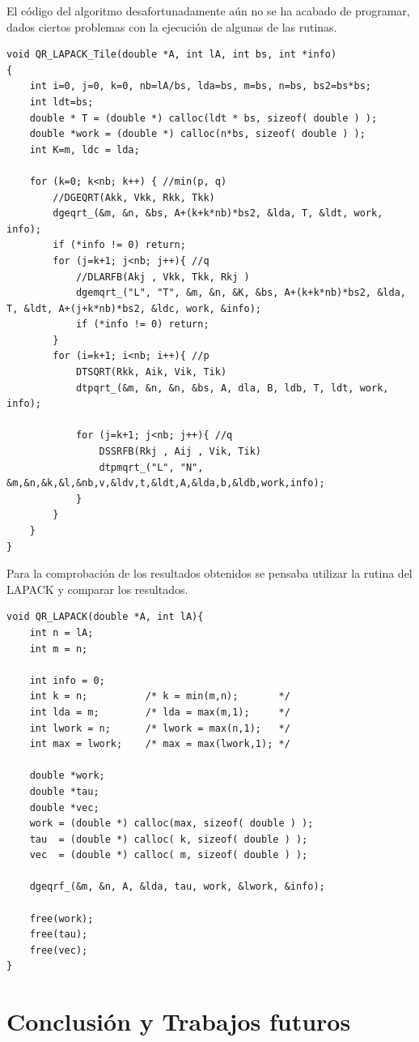 \documentclass[12pt]{article}
\begin{document}
El código del algoritmo desafortunadamente aún no se ha acabado de programar, dados ciertos problemas con la ejecución de algunas de las rutinas.
\begin{lstlisting}[basicstyle=\ttfamily\tiny]
void QR_LAPACK_Tile(double *A, int lA, int bs, int *info)
{
  	int i=0, j=0, k=0, nb=lA/bs, lda=bs, m=bs, n=bs, bs2=bs*bs;
  	int ldt=bs;
	double * T = (double *) calloc(ldt * bs, sizeof( double ) );
	double *work = (double *) calloc(n*bs, sizeof( double ) );
	int K=m, ldc = lda;

	for (k=0; k<nb; k++) { //min(p, q)
		//DGEQRT(Akk, Vkk, Rkk, Tkk)
		dgeqrt_(&m, &n, &bs, A+(k+k*nb)*bs2, &lda, T, &ldt, work, info);
		if (*info != 0) return;
		for (j=k+1; j<nb; j++){ //q
			//DLARFB(Akj , Vkk, Tkk, Rkj )
			dgemqrt_("L", "T", &m, &n, &K, &bs, A+(k+k*nb)*bs2, &lda, T, &ldt, A+(j+k*nb)*bs2, &ldc, work, &info);
			if (*info != 0) return;
		}
		for (i=k+1; i<nb; i++){ //p
			DTSQRT(Rkk, Aik, Vik, Tik)
			dtpqrt_(&m, &n, &n, &bs, A, dla, B, ldb, T, ldt, work, info);

			for (j=k+1; j<nb; j++){ //q
				DSSRFB(Rkj , Aij , Vik, Tik)
				dtpmqrt_("L", "N", &m,&n,&k,&l,&nb,v,&ldv,t,&ldt,A,&lda,b,&ldb,work,info);
			}
		}
	}
}
\end{lstlisting}


Para la comprobación de los resultados obtenidos se pensaba utilizar la rutina del LAPACK y comparar los resultados.

\begin{lstlisting}[basicstyle=\ttfamily\tiny]
void QR_LAPACK(double *A, int lA){
    int n = lA;
    int m = n;

    int info = 0;
    int k = n;          /* k = min(m,n);       */
    int lda = m;        /* lda = max(m,1);     */
    int lwork = n;      /* lwork = max(n,1);   */
    int max = lwork;    /* max = max(lwork,1); */

    double *work;
    double *tau;
    double *vec;
    work = (double *) calloc(max, sizeof( double ) );
    tau  = (double *) calloc( k, sizeof( double ) );
    vec  = (double *) calloc( m, sizeof( double ) );

    dgeqrf_(&m, &n, A, &lda, tau, work, &lwork, &info);
    
    free(work);
    free(tau);
	free(vec);
} 
\end{lstlisting}

\section{Conclusión y Trabajos futuros}
\label{sec:conc}
\end{document}
